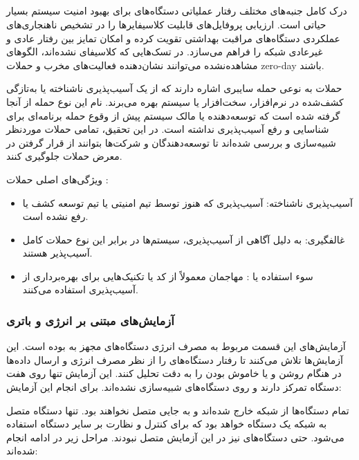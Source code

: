 \subsection{}

درک کامل جنبه‌های مختلف رفتار عملیاتی دستگاه‌های  برای بهبود امنیت سیستم
بسیار حیاتی است. ارزیابی پروفایل‌های  قابلیت کلاسیفایرها را در تشخیص
ناهنجاری‌های عملکردی دستگاه‌های مراقبت بهداشتی تقویت کرده و امکان تمایز بین
رفتار عادی و غیرعادی شبکه را فراهم می‌سازد. در تسک‌هایی که کلاسیفای نشده‌اند،
الگوهای مشاهده‌نشده می‌توانند نشان‌دهنده فعالیت‌های مخرب و حملات zero-day باشند.

حملات  به نوعی حمله سایبری اشاره دارند که از یک آسیب‌پذیری ناشناخته
یا به‌تازگی کشف‌شده در نرم‌افزار، سخت‌افزار یا سیستم بهره می‌برند. نام این نوع
حمله از آنجا گرفته شده است که توسعه‌دهنده یا مالک سیستم پیش از وقوع حمله
برنامه‌ای برای شناسایی و رفع آسیب‌پذیری نداشته است. در این تحقیق، تمامی حملات
موردنظر شبیه‌سازی و بررسی شده‌اند تا توسعه‌دهندگان و شرکت‌ها بتوانند از قرار
گرفتن در معرض حملات  جلوگیری کنند.

ویژگی‌های اصلی حملات  \cite{enwiki:1268124149}:

\begin{itemize}
    \item آسیب‌پذیری ناشناخته: آسیب‌پذیری که هنوز توسط تیم امنیتی یا تیم توسعه
    کشف یا رفع نشده است.
    \item غالفگیری: به دلیل آگاهی از آسیب‌‌پذیری، سیستم‌ها در برابر این نوع
    حملات کامل آسیب‌پذیر هستند.
    \item سوء استفاده یا : مهاجمان معمولاً از کد یا تکنیک‌هایی برای
    بهره‌برداری از آسیب‌پذیری استفاده می‌کنند.
\end{itemize}

\subsubsection{آزمایش‌های مبتنی بر انرژی و باتری}

آزمایش‌های این قسمت مربوط به مصرف انرژی دستگاه‌های مجهز به  بوده است.
این آزمایش‌ها تلاش می‌کنند تا رفتار دستگاه‌های  را از نظر مصرف انرژی و
ارسال داده‌ها در هنگام روشن و یا خاموش بودن را به دقت تحلیل کنند. این آزمایش
تنها روی هفت دستگاه  تمرکز دارند و روی دستگاه‌های  شبیه‌سازی
نشده‌اند. برای انجام این آزمایش:

تمام دستگاه‌ها از شبکه خارج شده‌اند و به جایی متصل نخواهند بود. تنها دستگاه متصل
به شبکه یک دستگاه  خواهد بود که برای کنترل و نظارت بر سایر دستگاه
استفاده می‌شود. حتی دستگاه‌های  نیز در این آزمایش متصل نبودند. مراحل زیر
در ادامه انجام شده‌اند:

